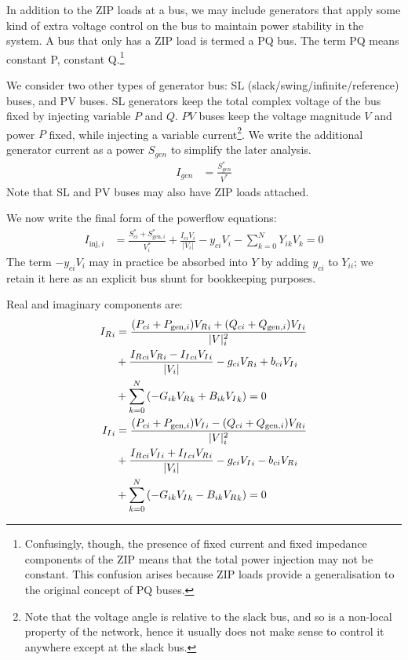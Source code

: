 \documentclass[11pt]{article}
\newcommand{\Vr}{{V_R}}
\newcommand{\Vi}{{V_I}}
\newcommand{\Ir}{{I_R}}
\newcommand{\Ii}{{I_I}}
\begin{document}
In addition to the ZIP loads at a bus, we may include generators that apply some kind of extra voltage control on the bus to maintain power stability in the system. A bus that only has a ZIP load is termed a PQ bus. The term PQ means constant P, constant Q.\footnote{Confusingly, though, the presence of fixed current and fixed impedance components of the ZIP means that the total power injection may not be constant. This confusion arises because ZIP loads provide a generalisation to the original concept of PQ buses.}

We consider two other types of generator bus: SL (slack/swing/infinite/reference) buses, and PV buses. SL generators keep the total complex voltage of the bus fixed by injecting variable $P$ and $Q$. $PV$ buses keep the voltage magnitude $V$ and power $P$ fixed, while injecting a variable current\footnote{Note that the voltage angle is relative to the slack bus, and so is a non-local property of the network, hence it usually does not make sense to control it anywhere except at the slack bus.}. We write the additional generator current as a power $S_{gen}$ to simplify the later analysis.
\begin{align}
I_{gen} &= \frac{S_{gen}^*}{V^*}
\end{align}
Note that SL and PV buses may also have ZIP loads attached.

We now write the final form of the powerflow equations:
\begin{align}
I_{\text{inj},i} &= \frac{S^*_{ci} + S^*_{\text{gen},i}}{V^*_i} + \frac{I_{ci}V_i}{|V_i|} - y_{ci}V_i - \sum_{k=0}^NY_{ik}V_k = 0
\label{EQ_POWERFLOW_COMPLEX}
\end{align}
The term $-y_{ci}V_i$ may in practice be absorbed into $Y$ by adding $y_{ci}$ to $Y_{ii}$; we retain it here as an explicit bus shunt for bookkeeping purposes.

Real and imaginary components are:
\begin{align}
	\Ir_i &= \frac{(P_{ci} + P_{\text{gen},i})\Vr_i + (Q_{ci} + Q_{\text{gen},i})\Vi_i}{|V|^2_i} \notag \\
	      &+ \frac{\Ir_{ci}\Vr_{i} - \Ii_{ci}\Vi_i}{|V_i|} -g_{ci}\Vr_i + b_{ci}\Vi_i \notag \\
	      &+ \sum_{k=0}^N\left(-G_{ik}\Vr_k + B_{ik}\Vi_k\right) = 0\\
	\Ii_i &= \frac{(P_{ci} + P_{\text{gen},i})\Vi_i - (Q_{ci} + Q_{\text{gen},i})\Vr_i}{|V|^2_i} \notag \\
	      &+ \frac{\Ir_{ci}\Vi_{i} + \Ii_{ci}\Vr_{i}}{|V_i|} -g_{ci}\Vi_i - b_{ci}\Vr_i \notag \\
	&+ \sum_{k=0}^N\left(-G_{ik}\Vi_k - B_{ik}\Vr_k\right) = 0
\end{align}
\end{document}
